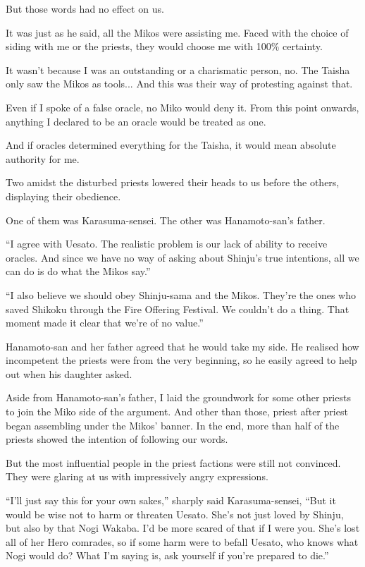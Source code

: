 But those words had no effect on us.

It was just as he said, all the Mikos were assisting me. Faced with the choice of siding with me or the priests, they would choose me with 100\% certainty.

It wasn't because I was an outstanding or a charismatic person, no. The Taisha only saw the Mikos as tools... And this was their way of protesting against that.

Even if I spoke of a false oracle, no Miko would deny it. From this point onwards, anything I declared to be an oracle would be treated as one.

And if oracles determined everything for the Taisha, it would mean absolute authority for me.

Two amidst the disturbed priests lowered their heads to us before the others, displaying their obedience.

One of them was Karasuma-sensei. The other was Hanamoto-san's father.

``I agree with Uesato. The realistic problem is our lack of ability to receive oracles. And since we have no way of asking about Shinju's true intentions, all we can do is do what the Mikos say.''

``I also believe we should obey Shinju-sama and the Mikos. They're the ones who saved Shikoku through the Fire Offering Festival. We couldn't do a thing. That moment made it clear that we're of no value.''

Hanamoto-san and her father agreed that he would take my side. He realised how incompetent the priests were from the very beginning, so he easily agreed to help out when his daughter asked.

Aside from Hanamoto-san's father, I laid the groundwork for some other priests to join the Miko side of the argument. And other than those, priest after priest began assembling under the Mikos' banner. In the end, more than half of the priests showed the intention of following our words.

But the most influential people in the priest factions were still not convinced. They were glaring at us with impressively angry expressions.

``I'll just say this for your own sakes,'' sharply said Karasuma-sensei, ``But it would be wise not to harm or threaten Uesato. She's not just loved by Shinju, but also by that Nogi Wakaba. I'd be more scared of that if I were you. She's lost all of her Hero comrades, so if some harm were to befall Uesato, who knows what Nogi would do? What I'm saying is, ask yourself if you're prepared to die.''

